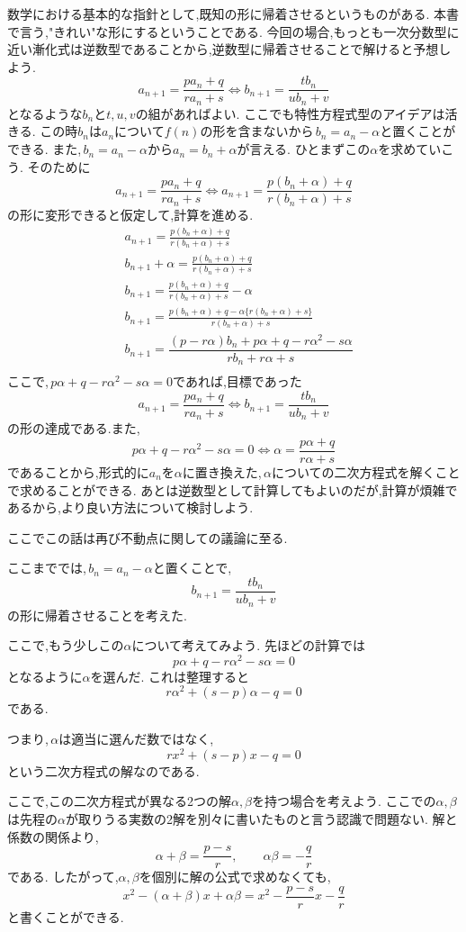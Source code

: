 数学における基本的な指針として,既知の形に帰着させるというものがある.
本書で言う,"きれい"な形にするということである.
今回の場合,もっとも一次分数型に近い漸化式は逆数型であることから,逆数型に帰着させることで解けると予想しよう.
\[
  a_{n+1}=\frac{pa_n+q}{ra_n+s} \Leftrightarrow b_{n+1}=\frac{tb_n}{u b_n+v}
\]
となるような$b_n$と$t,u,v$の組があればよい.
ここでも特性方程式型のアイデアは活きる.
この時$b_n$は$a_n$について$f(n)$の形を含まないから\,$b_n=a_n-\alpha$と置くことができる.
また,\,$b_n=a_n-\alpha$から$a_n=b_n+\alpha$が言える.
ひとまずこの$\alpha$を求めていこう.
そのために
\[
  a_{n+1}=\frac{pa_n+q}{ra_n+s} \Leftrightarrow a_{n+1}=\frac{p(b_n+\alpha)+q}{r(b_n+\alpha)+s}
\]
の形に変形できると仮定して,計算を進める.
\begin{align*}
   & a_{n+1}=\frac{p(b_n+\alpha)+q}{r(b_n+\alpha)+s}                                  \\
   & b_{n+1}+\alpha=\frac{p(b_n+\alpha)+q}{r(b_n+\alpha)+s}                           \\
   & b_{n+1}=\frac{p(b_n+\alpha)+q}{r(b_n+\alpha)+s}-\alpha                           \\
   & b_{n+1}=\frac{p(b_n+\alpha)+q-\alpha\{r(b_n+\alpha)+s\}}{r(b_n+\alpha)+s}        \\
   & b_{n+1}=\dfrac{(p-r\alpha)b_{n}+p\alpha+q-r\alpha^{2}-s\alpha}{rb_{n}+r\alpha+s} \\
\end{align*}
ここで,\,$p\alpha+q-r\alpha^{2}-s\alpha=0$であれば,目標であった
\[
  a_{n+1}=\frac{pa_n+q}{ra_n+s} \Leftrightarrow b_{n+1}=\frac{tb_n}{u b_n+v}
\]
の形の達成である.また,
\[
  p\alpha+q-r\alpha^{2}-s\alpha=0 \Leftrightarrow \alpha=\frac{p\alpha+q}{r\alpha+s}
\]
であることから,形式的に$a_n$を$\alpha$に置き換えた,\,$\alpha$についての二次方程式を解くことで求めることができる.
あとは逆数型として計算してもよいのだが,計算が煩雑であるから,より良い方法について検討しよう.

ここでこの話は再び不動点に関しての議論に至る.

ここまででは,\,$b_n=a_n-\alpha$と置くことで,
\[
  b_{n+1}=\frac{tb_n}{ub_n+v}
\]
の形に帰着させることを考えた.

ここで,もう少しこの$\alpha$について考えてみよう.
先ほどの計算では
\[
  p\alpha+q-r\alpha^2-s\alpha=0
\]
となるように$\alpha$を選んだ.
これは整理すると
\[
  r\alpha^2+(s-p)\alpha-q=0
\]
である.

つまり,\,$\alpha$は適当に選んだ数ではなく,
\[
  rx^2+(s-p)x-q=0
\]
という二次方程式の解なのである.

ここで,この二次方程式が異なる2つの解$\alpha,\beta$を持つ場合を考えよう.
ここでの$\alpha,\beta$は先程の$\alpha$が取りうる実数の2解を別々に書いたものと言う認識で問題ない.
解と係数の関係より,
\[
  \alpha+\beta=\frac{p-s}{r},
  \qquad
  \alpha\beta=-\frac qr
\]
である.
したがって,$\alpha,\beta$を個別に解の公式で求めなくても,
\[
  x^2-(\alpha+\beta)x+\alpha\beta
  =
  x^2-\frac{p-s}{r}x-\frac qr
\]
と書くことができる.

